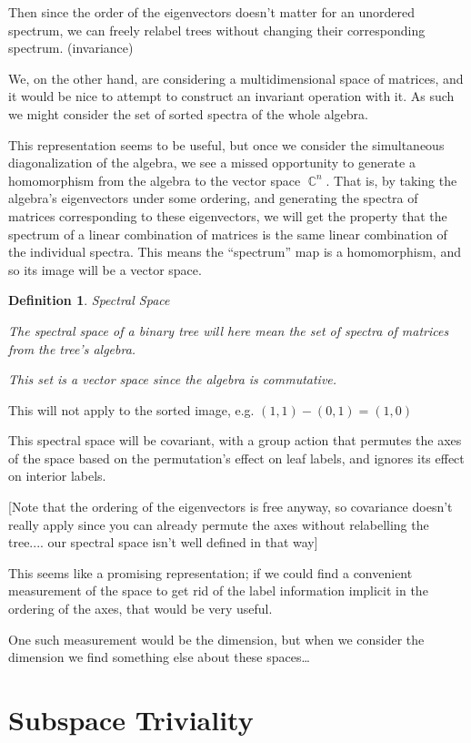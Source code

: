 \documentclass[10pt,a4paper]{report}
\DeclareMathOperator{\C}{\mathds{C}}
\newtheorem{definition}{Definition}
\begin{document}
Then since the order of the eigenvectors doesn't matter for an unordered spectrum, we can freely relabel
trees without changing their corresponding spectrum. (invariance)

We, on the other hand, are considering a multidimensional space of matrices,
and it would be nice to attempt to construct an invariant operation with it.
As such we might consider the set of sorted spectra of the whole algebra.

This representation seems to be useful, but once we consider the simultaneous
diagonalization of the algebra, we see a missed opportunity to generate a
homomorphism from the algebra to the vector space $\C^n$.
That is, by taking the algebra's eigenvectors under some ordering, and
generating the spectra of matrices corresponding to these eigenvectors, we will
get the property that the spectrum of a linear combination of matrices is the
same linear combination of the individual spectra.
This means the ``spectrum'' map is a homomorphism, and so its image will be a
vector space.

\begin{definition}Spectral Space

	The spectral space of a binary tree will here mean the set of spectra of
	matrices from the tree's algebra.

	This set is a vector space since the algebra is commutative.
\end{definition}


This will not apply to the sorted image, e.g. $(1, 1) - (0, 1) = (1, 0)$

This spectral space will be covariant, with a group action that permutes the axes of the space based on the permutation's effect on leaf labels, and ignores its effect on interior labels.

[Note that the ordering of the eigenvectors is free anyway, so covariance doesn't really apply since you can already permute the axes without relabelling the tree.... our spectral space isn't well defined in that way]

This seems like a promising representation; if we could find a convenient
measurement of the space to get rid of the label information implicit in the ordering of the axes, that would be very
useful.

One such measurement would be the dimension, but when we consider the dimension
we find something else about these spaces\ldots

\section{Subspace Triviality}
\end{document}

